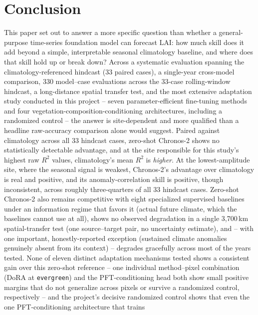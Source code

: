 \documentclass[11pt]{article}
\begin{document}
\section{Conclusion}
\label{sec:conclusion}

This paper set out to answer a more specific question than whether a general-purpose time-series
foundation model can forecast LAI: how much skill does it add beyond a simple, interpretable
seasonal climatology baseline, and where does that skill hold up or break down? Across a
systematic evaluation spanning the climatology-referenced hindcast (33 paired cases), a single-year
cross-model comparison, 330 model--case evaluations across the 33-case rolling-window hindcast, a long-distance spatial
transfer test, and the most extensive adaptation study conducted in this project -- seven
parameter-efficient fine-tuning methods and four vegetation-composition-conditioning architectures,
including a randomized control -- the answer is site-dependent and more qualified than a
headline raw-accuracy comparison alone would suggest. Paired against climatology across all 33
hindcast cases, zero-shot Chronos-2 shows no statistically detectable advantage, and at the site
responsible for this study's highest raw $R^2$ values, climatology's mean $R^2$ is \emph{higher}.
At the lowest-amplitude site, where the seasonal signal is weakest, Chronos-2's advantage over
climatology is real and positive, and its anomaly-correlation skill is positive, though
inconsistent, across roughly three-quarters of all 33 hindcast cases. Zero-shot Chronos-2 also
remains competitive with eight specialized supervised baselines under an information regime that
favors it (actual future climate, which the baselines cannot use at all), shows no observed
degradation in a single 3{,}700\,km spatial-transfer test (one source--target pair, no
uncertainty estimate), and -- with one important, honestly-reported
exception (sustained climate anomalies genuinely absent from its context) -- degrades gracefully
across most of the years tested. None of eleven distinct adaptation mechanisms tested shows a
consistent gain over this zero-shot reference -- one individual method--pixel combination (DoRA at
\texttt{evergreen}) and the PFT-conditioning head both show small positive margins that do not
generalize across pixels or survive a randomized control, respectively -- and the project's
decisive randomized control shows that even the one PFT-conditioning architecture that trains
\end{document}
